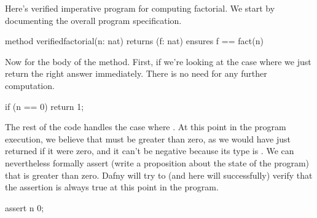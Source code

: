 \documentclass[letterpaper,10pt,english]{sphinxmanual}
\begin{document}
Here’s verified imperative program for computing factorial. We start
by documenting the overall program specification.

\begin{sphinxVerbatim}[commandchars=\\\{\}]
method verified\PYGZus{}factorial(n: nat) returns (f: nat)
    ensures f == fact(n)
\end{sphinxVerbatim}

Now for the body of the method. First, if we’re looking at the case
where  we just return the right answer immediately. There is
no need for any further computation.

\begin{sphinxVerbatim}[commandchars=\\\{\}]
if (n == 0)
\PYGZob{}
    return 1;
\PYGZcb{}
\end{sphinxVerbatim}

The rest of the code handles the case where . At this point in
the program execution, we believe that  must be greater than zero,
as we would have just returned if it were zero, and it can’t be
negative because its type is . We can nevertheless formally
assert (write a proposition about the state of the program) that 
is greater than zero. Dafny will try to (and here will successfully)
verify that the assertion is always true at this point in the program.

\begin{sphinxVerbatim}[commandchars=\\\{\}]
assert n \PYGZgt{} 0;
\end{sphinxVerbatim}
\end{document}
